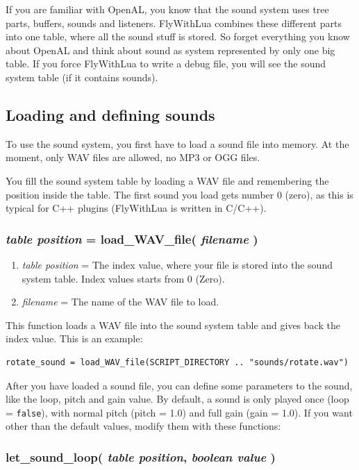 \documentclass[11pt,parskip=half,a4paper]{scrartcl}
\begin{document}
If you are familiar with OpenAL, you know that the sound system uses tree parts, buffers, sounds and listeners. FlyWithLua combines these different parts into one table, where all the sound stuff is stored. So forget everything you know about OpenAL and think about sound as system represented by only one big table. If you force FlyWithLua to write a debug file, you will see the sound system table (if it contains sounds).

\subsection{Loading and defining sounds}

To use the sound system, you first have to load a sound file into memory. At the moment, only WAV files are allowed, no MP3 or OGG files.

You fill the sound system table by loading a WAV file and remembering the position inside the table. The first sound you load gets number 0 (zero), as this is typical for C++ plugins (FlyWithLua is written in C/C++).

\subsubsection{\emph{table position} = load\_WAV\_file( \emph{filename} )}

\begin{enumerate}
	\item \emph{table position} = The index value, where your file is stored into the sound system table. Index values starts from 0 (Zero).
	\item \emph{filename} = The name of the WAV file to load.
\end{enumerate}

This function loads a WAV file into the sound system table and gives back the index value. This is an example:


\begin{lstlisting}
rotate_sound = load_WAV_file(SCRIPT_DIRECTORY .. "sounds/rotate.wav")
\end{lstlisting}

After you have loaded a sound file, you can define some parameters to the sound, like the loop, pitch and gain value. By default, a sound is only played once (loop = \verb|false|), with normal pitch (pitch = 1.0) and full gain (gain = 1.0). If you want other than the default values, modify them with these functions:

\subsubsection{ let\_sound\_loop( \emph{table position}, \emph{boolean value} )}
\end{document}
